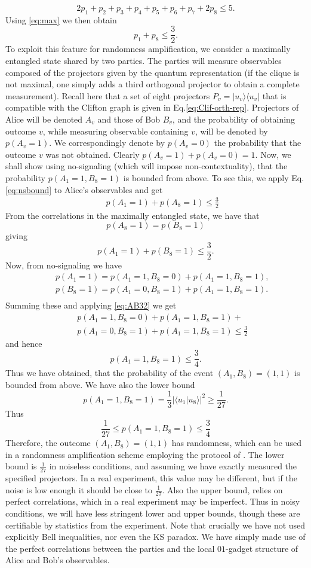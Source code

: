 \documentclass[twocolumn, a4paper, superscriptaddress,nofootinbib, accepted=2020-08-07, hyperref]{quantumarticle}
\def\be{\begin{equation}}
\def\ee{\end{equation}}
\def\ben{\begin{eqnarray}}
\def\een{\end{eqnarray}}
\def\>{\rangle}
\def\<{\langle}
\def\be{\begin{equation}}
\def\ee{\end{equation}}
\begin{document}
\be
2p_1 + p_2+p_3+p_4+p_5+p_6+p_7+ 2 p_8 \leq 5.
\ee
Using \eqref{eq:max} we then obtain
\be
\label{eq:nsbound}
p_1+p_8\leq \frac32.
\ee
To exploit this feature for randomness amplification, 
we consider a maximally entangled state shared by two parties. The parties will measure observables composed of the 
projectors given by the quantum representation (if the clique is not maximal, one simply adds a third orthogonal projector to obtain a complete measurement).
Recall here that a set of eight projectors $P_v=|u_v\>\<u_v|$ that is compatible with the Clifton graph
is given in Eq.\eqref{eq:Clif-orth-rep}.
Projectors of Alice will be denoted $A_v$ and those of Bob $B_v$, 
and the probability of obtaining outcome $v$, while measuring observable containing $v$, will be denoted by $p(A_v=1)$.
We correspondingly denote by  $p(A_v=0)$ the probability that the outcome $v$ was not obtained. Clearly $p(A_v=1)+p(A_v=0)=1$.
Now, we shall show using no-signaling (which will impose non-contextuality), that the probability $p(A_1=1,B_8=1)$ 
is bounded from above. 
To see this, we apply Eq.\eqref{eq:nsbound} to Alice's observables and get
\ben
&&p(A_1=1)+p(A_8=1)\leq \frac32
\een
From the correlations in the maximally entangled state, we have that 
\be
p(A_8=1)=p(B_8=1)
\ee
giving 
\be
\label{eq:AB32}
p(A_1 = 1)+p(B_8 = 1)\leq \frac32.
\ee
Now, from no-signaling we have 
\ben
&&p(A_1=1)=  p(A_1 = 1, B_8 = 0) + p(A_1 = 1, B_8 = 1), \nonumber \\
&&p(B_8 = 1) =  p(A_1 = 0, B_8 = 1) + p(A_1 = 1, B_8 = 1).  \nonumber\\
\een
Summing these and applying \eqref{eq:AB32} we get 
\ben
&&p(A_1 = 1, B_8 = 0) + p(A_1 = 1, B_8 = 1)   +  \nonumber \\
&& p(A_1 = 0, B_8 = 1) + p(A_1 = 1, B_8 = 1) \leq   \frac32 
\een
and hence 
\be
p(A_1=1,B_8=1)\leq \frac34.
\ee
Thus we have obtained, that the probability of the event $(A_1,B_8)=(1,1)$ is bounded from above. 
We have also the lower bound
\be
p(A_1=1,B_8=1) = \frac13  |\<u_1|u_8\>|^2 \geq \frac1{27}.
\ee
Thus 
\be
\frac1{27}\leq p(A_1=1,B_8=1) \leq \frac34
\ee
Therefore, the outcome $(A_1,B_8)=(1,1)$ has randomness, which can be used in a randomness amplification scheme employing the protocol of \cite{PRL-rand}.
The lower bound is $\frac1{27}$ in noiseless conditions, and assuming we have exactly measured the specified projectors. 
In a real experiment, this value may be different, but if the noise is low enough it should be close to $\frac1{27}$.
Also the upper bound, relies on perfect correlations, which in a real experiment may be imperfect. Thus in noisy conditions, we will 
have less stringent lower and upper bounds, though these are certifiable by statistics from the experiment. 
Note that crucially we have not used explicitly Bell inequalities, nor even the KS paradox. We have simply made use of the perfect correlations between the parties and the local  $01$-gadget structure of Alice and Bob's observables. \\
\end{document}
